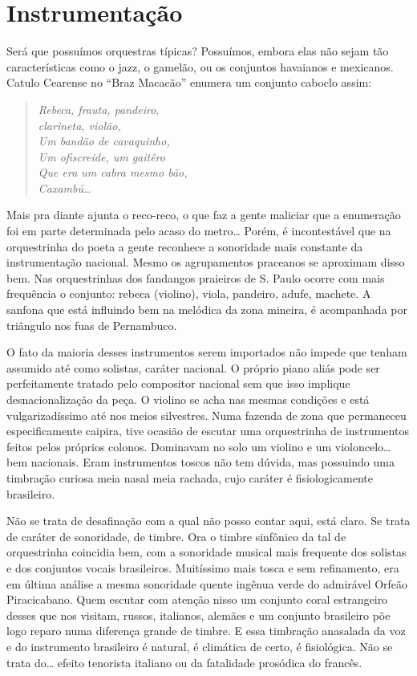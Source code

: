 \section{Instrumentação}

Será que possuímos orquestras típicas? Possuímos, embora elas não sejam
tão características como o jazz, o gamelão, ou os conjuntos havaianos e
mexicanos. Catulo Cearense no ``Braz Macacão'' enumera um conjunto caboclo
assim:

\begin{verse}
\emph{Rebeca, frauta, pandeiro,}\\
\emph{clarineta, violão,}\\
\emph{Um bandão de cavaquinho,}\\
\emph{Um ofiscreide, um gaitêro}\\
\emph{Que era um cabra mesmo bão,}\\
\emph{Caxambú\ldots{}}
\end{verse}

Mais pra diante ajunta o reco-reco, o que faz a gente maliciar que a
enumeração foi em parte determinada pelo acaso do metro\ldots{} Porém, é
incontestável que na orquestrinha do poeta a gente reconhece a
sonoridade mais constante da instrumentação nacional. Mesmo os
agrupamentos praceanos se aproximam disso bem. Nas orquestrinhas dos
fandangos praieiros de S. Paulo ocorre com mais frequência o conjunto:
rebeca (violino), viola, pandeiro, adufe, machete. A sanfona que está
influindo bem na melódica da zona mineira, é acompanhada por triângulo
nos fuas de Pernambuco.

O fato da maioria desses instrumentos serem importados não impede que
tenham assumido até como solistas, caráter nacional. O próprio piano
aliás pode ser perfeitamente tratado pelo compositor nacional sem que
isso implique desnacionalização da peça. O violino se acha nas mesmas
condições e está vulgarizadíssimo até nos meios silvestres. Numa fazenda
de zona que permaneceu especificamente caipira, tive ocasião de escutar
uma orquestrinha de instrumentos feitos pelos próprios colonos.
Dominavam no solo um violino e um violoncelo\ldots{} bem nacionais. Eram
instrumentos toscos não tem dúvida, mas possuindo uma timbração curiosa
meia nasal meia rachada, cujo caráter é fisiologicamente brasileiro.

Não se trata de desafinação com a qual não posso contar aqui, está
claro. Se trata de caráter de sonoridade, de timbre. Ora o timbre
sinfônico da tal de orquestrinha coincidia bem, com a sonoridade musical
mais frequente dos solistas e dos conjuntos vocais brasileiros.
Muitíssimo mais tosca e sem refinamento, era em última análise a mesma
sonoridade quente ingênua verde do admirável Orfeão Piracicabano. Quem
escutar com atenção nisso um conjunto coral estrangeiro desses que nos
visitam, russos, italianos, alemães e um conjunto brasileiro põe logo
reparo numa diferença grande de timbre. E essa timbração anasalada da
voz e do instrumento brasileiro é natural, é climática de certo, é
fisiológica. Não se trata do\ldots{} efeito tenorista italiano ou da
fatalidade prosódica do francês.

